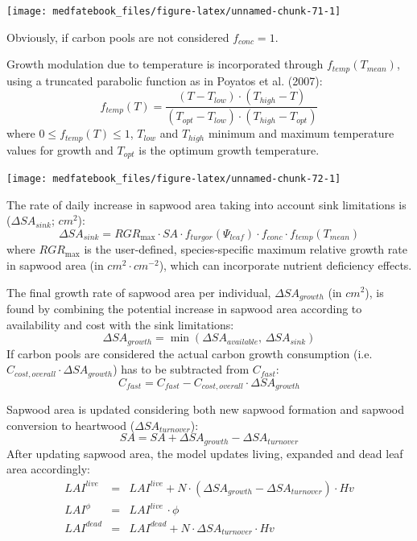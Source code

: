\documentclass[]{book}
\begin{document}
\begin{center}\texttt{[image: medfatebook\_files/figure-latex/unnamed-chunk-71-1]} \end{center}

Obviously, if carbon pools are not considered \(f_{conc} = 1\).

Growth modulation due to temperature is incorporated through \(f_{temp}(T_{mean})\), using a truncated parabolic function as in Poyatos et al. (2007):
\begin{equation}
f_{temp}(T) = \frac{(T-T_{low}) \cdot (T_{high}-T)}{(T_{opt}-T_{low}) \cdot (T_{high}-T_{opt})}
\end{equation}
where \(0 \leq f_{temp}(T) \leq 1\), \(T_{low}\) and \(T_{high}\) minimum and maximum temperature values for growth and \(T_{opt}\) is the optimum growth temperature.

\begin{center}\texttt{[image: medfatebook\_files/figure-latex/unnamed-chunk-72-1]} \end{center}

The rate of daily increase in sapwood area taking into account sink limitations is (\(\Delta SA_{sink}\); \(cm^2\)):
\begin{equation}
\Delta SA_{sink} = RGR_{\max} \cdot SA \cdot f_{turgor}(\Psi_{leaf}) \cdot f_{conc} \cdot f_{temp}(T_{mean})
\end{equation}
where \(RGR_{\max}\) is the user-defined, species-specific maximum relative growth rate in sapwood area (in \(cm^2·cm^{-2}\)), which can incorporate nutrient deficiency effects.

The final growth rate of sapwood area per individual, \(\Delta SA_{growth}\) (in \(cm^2\)), is found by combining the potential increase in sapwood area according to availability and cost with the sink limitations:
\begin{equation}
\Delta SA_{growth} = \min(\Delta SA_{available}, \, \Delta SA_{sink})
\end{equation}
If carbon pools are considered the actual carbon growth consumption (i.e. \(C_{cost,overall} \cdot \Delta SA_{growth}\)) has to be subtracted from \(C_{fast}\):
\begin{equation}
C_{fast} = C_{fast} - C_{cost,overall} \cdot \Delta SA_{growth}
\end{equation}

Sapwood area is updated considering both new sapwood formation and sapwood conversion to heartwood (\(\Delta SA_{turnover}\)):
\begin{equation}
SA = SA + \Delta SA_{growth} - \Delta SA_{turnover} 
\end{equation}
After updating sapwood area, the model updates living, expanded and dead leaf area accordingly:
\begin{eqnarray}
LAI^{live} &=& LAI^{live} + N \cdot (\Delta SA_{growth} - \Delta SA_{turnover}) \cdot Hv \\
LAI^{\phi} &=& LAI^{live}\,\cdot\phi \\
LAI^{dead} &=& LAI^{dead} + N \cdot \Delta SA_{turnover} \cdot Hv 
\end{eqnarray}
\end{document}
